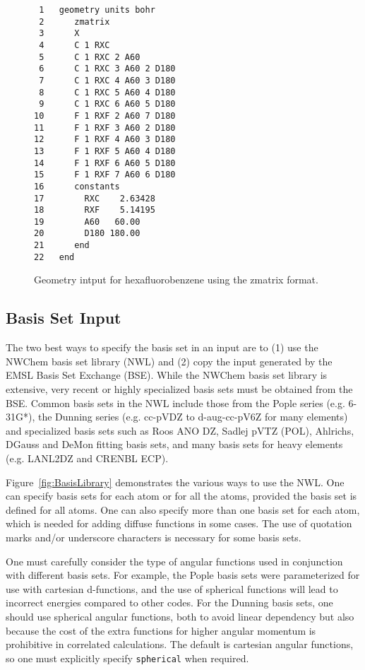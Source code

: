 \documentclass[letterpaper,12pt]{article}
\begin{document}
\begin{figure}
    \caption{Geometry intput for hexafluorobenzene using the zmatrix format.}
    \label{fig:HexafluorobenzeneZMatrix}
    \begin{verbatim}
 1   geometry units bohr
 2      zmatrix
 3      X
 4      C 1 RXC
 5      C 1 RXC 2 A60
 6      C 1 RXC 3 A60 2 D180
 7      C 1 RXC 4 A60 3 D180
 8      C 1 RXC 5 A60 4 D180
 9      C 1 RXC 6 A60 5 D180
10      F 1 RXF 2 A60 7 D180
11      F 1 RXF 3 A60 2 D180
12      F 1 RXF 4 A60 3 D180
13      F 1 RXF 5 A60 4 D180
14      F 1 RXF 6 A60 5 D180
15      F 1 RXF 7 A60 6 D180
16      constants
17        RXC    2.63428
18        RXF    5.14195
19        A60   60.00
20        D180 180.00
21      end
22   end
    \end{verbatim}
\end{figure}

\newpage

\subsection{Basis Set Input}\label{sec:BasisSetInput}

The two best ways to specify the basis set in an input are to (1) use the NWChem basis set library (NWL) and (2) copy the input generated by the EMSL Basis Set Exchange (BSE).  While the NWChem basis set library is extensive, very recent or highly specialized basis sets must be obtained from the BSE.  Common basis sets in the NWL include those from the Pople series (e.g. 6-31G*), the Dunning series (e.g. cc-pVDZ to d-aug-cc-pV6Z for many elements) and specialized basis sets such as Roos ANO DZ, Sadlej pVTZ (POL), Ahlrichs, DGauss and DeMon fitting basis sets, and many basis sets for heavy elements (e.g. LANL2DZ and CRENBL ECP).

Figure~\ref{fig:BasisLibrary} demonstrates the various ways to use the NWL.  One can specify basis sets for each atom or for all the atoms, provided the basis set is defined for all atoms.  One can also specify more than one basis set for each atom, which is needed for adding diffuse functions in some cases.  The use of quotation marks and/or underscore characters is necessary for some basis sets.

One must carefully consider the type of angular functions used in conjunction with different basis sets.  For example, the Pople basis sets were parameterized for use with cartesian d-functions, and the use of spherical functions will lead to incorrect energies compared to other codes.  For the Dunning basis sets, one should use spherical angular functions, both to avoid linear dependency but also because the cost of the extra functions for higher angular momentum is prohibitive in correlated calculations.  The default is cartesian angular functions, so one must explicitly specify \texttt{spherical} when required.
\end{document}

